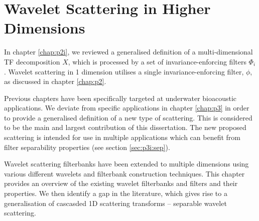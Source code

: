 \chapter{Wavelet Scattering in Higher Dimensions}
\label{chap:p3i}

In chapter \ref*{chap:p2i}, we reviewed a generalised definition of a multi-dimensional TF decomposition $X$, which is processed by a set of invariance-enforcing filters $\Phi_i$. Wavelet scattering in 1 dimension utilises a single invariance-enforcing filter, $\phi$, as discussed in chapter \ref*{chap:p2}.

Previous chapters have been specifically targeted at underwater bioacoustic applications. We deviate from specific applications in chapter \ref*{chap:p3} in order to provide a generalised definition of a new type of scattering. This is considered to be the main and largest contribution of this dissertation. The new proposed scattering is intended for use in multiple applications which can benefit from filter separability properties (see section \ref*{sec:p3i:sep}).

Wavelet scattering filterbanks have been extended to multiple dimensions using various different wavelets and filterbank construction techniques. This chapter provides an over\-view of the existing wavelet filterbanks and filters and their properties. We then identify a gap in the literature, which gives rise to a generalisation of cascasded 1D scattering transforms -- separable wavelet scattering.


